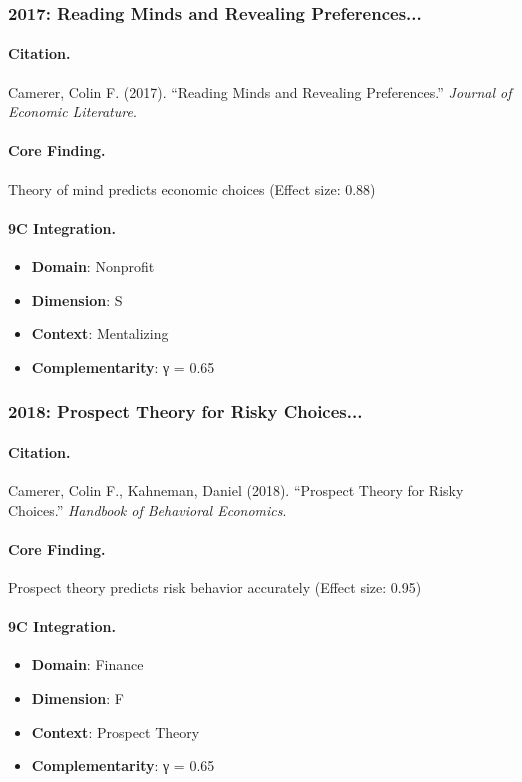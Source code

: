 \subsubsection{2017: Reading Minds and Revealing Preferences...}

\paragraph{Citation.}
Camerer, Colin F. (2017). ``Reading Minds and Revealing Preferences.''
\textit{Journal of Economic Literature}.

\paragraph{Core Finding.}
Theory of mind predicts economic choices (Effect size: 0.88)

\paragraph{9C Integration.}
\begin{itemize}[nosep]
  \item \textbf{Domain}: Nonprofit
  \item \textbf{Dimension}: S
  \item \textbf{Context}: Mentalizing
  \item \textbf{Complementarity}: γ = 0.65
\end{itemize}

\subsubsection{2018: Prospect Theory for Risky Choices...}

\paragraph{Citation.}
Camerer, Colin F., Kahneman, Daniel (2018). ``Prospect Theory for Risky Choices.''
\textit{Handbook of Behavioral Economics}.

\paragraph{Core Finding.}
Prospect theory predicts risk behavior accurately (Effect size: 0.95)

\paragraph{9C Integration.}
\begin{itemize}[nosep]
  \item \textbf{Domain}: Finance
  \item \textbf{Dimension}: F
  \item \textbf{Context}: Prospect Theory
  \item \textbf{Complementarity}: γ = 0.65
\end{itemize}

